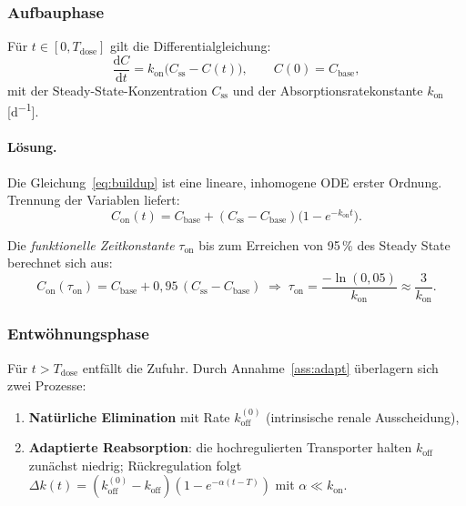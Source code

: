 ﻿\documentclass[12pt,a4paper]{article}
\theoremstyle{plain}
\theoremstyle{definition}
\theoremstyle{remark}
\begin{document}
\subsubsection{Aufbauphase}

Für $t \in [0, T_\text{dose}]$ gilt die Differentialgleichung:
\begin{equation}
  \frac{\mathrm{d}C}{\mathrm{d}t} = k_\text{on}\bigl(C_\text{ss} - C(t)\bigr),
  \qquad C(0) = C_\text{base},
  \label{eq:buildup}
\end{equation}
mit der Steady-State-Konzentration $C_\text{ss}$ und der
Absorptionsratekonstante $k_\text{on}$ [\si{d^{-1}}].

\paragraph{Lösung.} Die Gleichung~\eqref{eq:buildup} ist eine
lineare, inhomogene ODE erster Ordnung. Trennung der Variablen liefert:
\begin{equation}
  \boxed{C_\text{on}(t) = C_\text{base} + (C_\text{ss} - C_\text{base})
    \bigl(1 - e^{-k_\text{on} t}\bigr).}
  \label{eq:C_on}
\end{equation}

Die \emph{funktionelle Zeitkonstante} $\tau_\text{on}$ bis zum Erreichen von
95\,\% des Steady State berechnet sich aus:
\begin{equation}
  C_\text{on}(\tau_\text{on}) = C_\text{base} + 0{,}95\,(C_\text{ss}-C_\text{base})
  \;\Longrightarrow\; \tau_\text{on} = \frac{-\ln(0{,}05)}{k_\text{on}} \approx \frac{3}{k_\text{on}}.
  \label{eq:tau_on}
\end{equation}

\subsubsection{Entwöhnungsphase}

Für $t > T_\text{dose}$ entfällt die Zufuhr. Durch Annahme~\ref{ass:adapt}
überlagern sich zwei Prozesse:
\begin{enumerate}
  \item \textbf{Natürliche Elimination} mit Rate $k_\text{off}^{(0)}$
        (intrinsische renale Ausscheidung),
  \item \textbf{Adaptierte Reabsorption}: die hochregulierten Transporter
        halten $k_\text{off}$ zunächst niedrig; Rückregulation folgt
        $\Delta k(t) = (k_\text{off}^{(0)} - k_\text{off})(1-e^{-\alpha(t-T)})$
        mit $\alpha \ll k_\text{on}$.
\end{enumerate}
\end{document}
